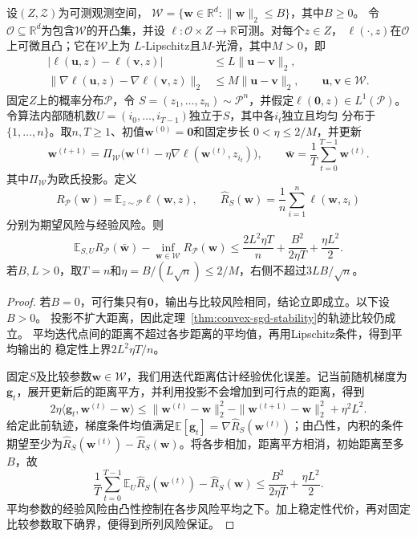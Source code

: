 \begin{theorem}[平均投影SGD的期望风险保证]
\label{thm:averaged-sgd-learning}
设$(Z,\mathcal Z)$为可测观测空间，
$\mathcal W=\{\bm w\in\mathbb R^d:\|\bm w\|_2\leq B\}$，其中$B\geq0$。
令$\mathcal O\subseteq\mathbb R^d$为包含$\mathcal W$的开凸集，并设
$\ell:\mathcal O\times Z\to\mathbb R$可测。对每个$z\in Z$，
$\ell(\cdot,z)$在$\mathcal O$上可微且凸；它在$\mathcal W$上为
$L$-Lipschitz且$M$-光滑，其中$M>0$，即
\[
\begin{aligned}
 |\ell(\bm u,z)-\ell(\bm v,z)|
 &\leq L\|\bm u-\bm v\|_2,\\
 \|\nabla\ell(\bm u,z)-\nabla\ell(\bm v,z)\|_2
 &\leq M\|\bm u-\bm v\|_2,
 \qquad \bm u,\bm v\in\mathcal W.
\end{aligned}
\]
固定$Z$上的概率分布$\mathcal P$，令
$S=(z_1,\ldots,z_n)\sim\mathcal P^n$，并假定$\ell(\bm 0,z)\in L^1(\mathcal P)$。
令算法内部随机数$U=(i_0,\ldots,i_{T-1})$独立于$S$，其中各$i_t$独立且均匀
分布于$\{1,\ldots,n\}$。取$n,T\geq1$、初值$\bm w^{(0)}=\bm 0$和固定步长
$0<\eta\leq2/M$，并更新
\[
 \bm w^{(t+1)}=\Pi_{\mathcal W}
   \bigl(\bm w^{(t)}-\eta\nabla\ell(\bm w^{(t)},z_{i_t})\bigr),
 \qquad
 \bar{\bm w}=\frac1T\sum_{t=0}^{T-1}\bm w^{(t)}.
\]
其中$\Pi_{\mathcal W}$为欧氏投影。定义
\[
 R_{\mathcal P}(\bm w)=\mathbb E_{z\sim\mathcal P}\ell(\bm w,z),
 \qquad
 \hat R_S(\bm w)=\frac1n\sum_{i=1}^n\ell(\bm w,z_i)
\]
分别为期望风险与经验风险。则
\[
 \mathbb E_{S,U}R_{\mathcal P}(\bar{\bm w})-\inf_{\bm w\in\mathcal W}R_{\mathcal P}(\bm w)
 \leq\frac{2L^2\eta T}{n}+\frac{B^2}{2\eta T}+\frac{\eta L^2}{2}.
\]
若$B,L>0$，取$T=n$和$\eta=B/(L\sqrt n)\leq2/M$，右侧不超过$3LB/\sqrt n$。
\end{theorem}
\begin{proof}
若$B=0$，可行集只有$\bm0$，输出与比较风险相同，结论立即成立。以下设$B>0$。
投影不扩大距离，因此定理~\ref{thm:convex-sgd-stability}的轨迹比较仍成立。
平均迭代点间的距离不超过各步距离的平均值，再用Lipschitz条件，得到平均输出的
稳定性上界$2L^2\eta T/n$。

固定$S$及比较参数$\bm w\in\mathcal W$，我们用迭代距离估计经验优化误差。记当前随机梯度为$\bm g_t$，展开更新后的距离平方，并利用投影不会增加到可行点的距离，得到
\[
 2\eta\langle\bm g_t,\bm w^{(t)}-\bm w\rangle
 \leq\|\bm w^{(t)}-\bm w\|_2^2
 -\|\bm w^{(t+1)}-\bm w\|_2^2+\eta^2L^2.
\]
给定此前轨迹，梯度条件均值满足$\mathbb E[\bm g_t]=\nabla\hat R_S(\bm w^{(t)})$；由凸性，内积的条件期望至少为$\hat R_S(\bm w^{(t)})-\hat R_S(\bm w)$。将各步相加，距离平方相消，初始距离至多$B$，故
\[
 \frac1T\sum_{t=0}^{T-1}\mathbb E_U\hat R_S(\bm w^{(t)})-\hat R_S(\bm w)
 \leq\frac{B^2}{2\eta T}+\frac{\eta L^2}{2}.
\]
平均参数的经验风险由凸性控制在各步风险平均之下。加上稳定性代价，再对固定比较参数取下确界，便得到所列风险保证。
\end{proof}


